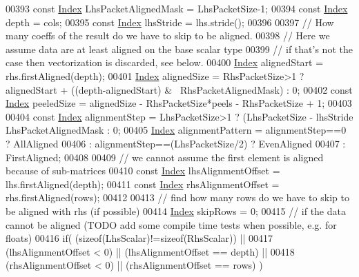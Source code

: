 \begin{DoxyCode}
{00393   \textcolor{keyword}{const} \hyperlink{namespace_eigen_a62e77e0933482dafde8fe197d9a2cfde}{Index} LhsPacketAlignedMask = LhsPacketSize-1;
00394   \textcolor{keyword}{const} \hyperlink{namespace_eigen_a62e77e0933482dafde8fe197d9a2cfde}{Index} depth = cols;
00395   \textcolor{keyword}{const} \hyperlink{namespace_eigen_a62e77e0933482dafde8fe197d9a2cfde}{Index} lhsStride = lhs.stride();
00396 
00397   \textcolor{comment}{// How many coeffs of the result do we have to skip to be aligned.}
00398   \textcolor{comment}{// Here we assume data are at least aligned on the base scalar type}
00399   \textcolor{comment}{// if that's not the case then vectorization is discarded, see below.}
00400   \hyperlink{namespace_eigen_a62e77e0933482dafde8fe197d9a2cfde}{Index} alignedStart = rhs.firstAligned(depth);
00401   \hyperlink{namespace_eigen_a62e77e0933482dafde8fe197d9a2cfde}{Index} alignedSize = RhsPacketSize>1 ? alignedStart + ((depth-alignedStart) & ~RhsPacketAlignedMask) 
      : 0;
00402   \textcolor{keyword}{const} \hyperlink{namespace_eigen_a62e77e0933482dafde8fe197d9a2cfde}{Index} peeledSize = alignedSize - RhsPacketSize*peels - RhsPacketSize + 1;
00403 
00404   \textcolor{keyword}{const} \hyperlink{namespace_eigen_a62e77e0933482dafde8fe197d9a2cfde}{Index} alignmentStep = LhsPacketSize>1 ? (LhsPacketSize - lhsStride %
      LhsPacketAlignedMask : 0;
00405   \hyperlink{namespace_eigen_a62e77e0933482dafde8fe197d9a2cfde}{Index} alignmentPattern = alignmentStep==0 ? AllAligned
00406                            : alignmentStep==(LhsPacketSize/2) ? EvenAligned
00407                            : FirstAligned;
00408 
00409   \textcolor{comment}{// we cannot assume the first element is aligned because of sub-matrices}
00410   \textcolor{keyword}{const} \hyperlink{namespace_eigen_a62e77e0933482dafde8fe197d9a2cfde}{Index} lhsAlignmentOffset = lhs.firstAligned(depth);
00411   \textcolor{keyword}{const} \hyperlink{namespace_eigen_a62e77e0933482dafde8fe197d9a2cfde}{Index} rhsAlignmentOffset = rhs.firstAligned(rows);
00412 
00413   \textcolor{comment}{// find how many rows do we have to skip to be aligned with rhs (if possible)}
00414   \hyperlink{namespace_eigen_a62e77e0933482dafde8fe197d9a2cfde}{Index} skipRows = 0;
00415   \textcolor{comment}{// if the data cannot be aligned (TODO add some compile time tests when possible, e.g. for floats)}
00416   \textcolor{keywordflow}{if}( (\textcolor{keyword}{sizeof}(LhsScalar)!=\textcolor{keyword}{sizeof}(RhsScalar)) ||
00417       (lhsAlignmentOffset < 0) || (lhsAlignmentOffset == depth) ||
00418       (rhsAlignmentOffset < 0) || (rhsAlignmentOffset == rows) )
}
\end{DoxyCode}
